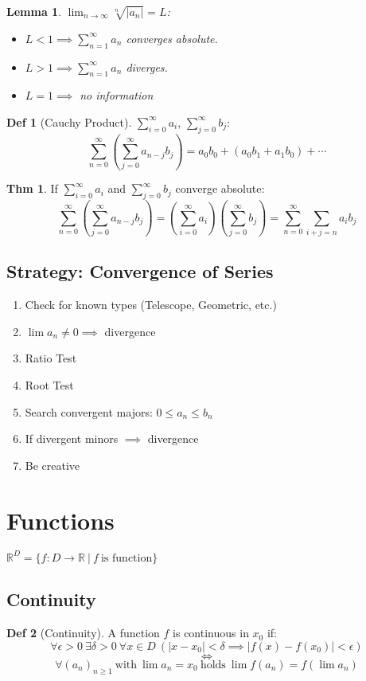 \documentclass[a4paper, 10pt]{article}
\newtheorem*{lemma}{Lemma}
\theoremstyle{definition}
\newtheorem*{theorem}{Thm}
\newtheorem*{definition}{Def}
\theoremstyle{named}
\newcommand{\R}{\mathbb{R}}
\begin{document}
\begin{lemma}
    $\lim_{n\to\infty} \sqrt[n]{|a_n|} = L$:

    \begin{itemize}
        \item $L < 1 \implies \sum_{n=1}^\infty a_n$ converges absolute.
        \item $L > 1 \implies \sum_{n=1}^\infty a_n$ diverges.
        \item $L = 1 \implies$ no information
    \end{itemize}
\end{lemma}

\begin{definition}[Cauchy Product]
    $\sum_{i=0}^\infty a_i$, $\sum_{j=0}^\infty b_j$:
    $$\sum_{n=0}^\infty (\sum_{j=0}^\infty a_{n-j}b_j) = a_0b_0 + (a_0b_1 + a_1b_0) + \cdots$$
\end{definition}

\begin{theorem}
    If $\sum_{i=0}^\infty a_i$ and $\sum_{j=0}^\infty b_j$ converge absolute:
    $$\sum_{n=0}^\infty (\sum_{j=0}^\infty a_{n-j}b_j) = (\sum_{i=0}^\infty a_i) (\sum_{j=0}^\infty b_j) = \sum_{n=0}^\infty \sum_{i+j = n} a_i b_j$$
\end{theorem}

\subsection{Strategy: Convergence of Series}
\begin{enumerate}
    \item Check for known types (Telescope, Geometric, etc.)
    \item $\lim a_n \neq 0 \implies$ divergence
    \item Ratio Test
    \item Root Test
    \item Search convergent majors: $0 \leq a_n \leq b_n$
    \item If divergent minors $\implies$ divergence
    \item Be creative
\end{enumerate}

\section{Functions}
$\R^D = \{f: D \to \R \ | \ f \ \text{is function} \}$
\subsection{Continuity}
\begin{definition}[Continuity]
    A function $f$ is continuous in $x_0$ if:
    $$\forall \epsilon > 0 \ \exists \delta > 0 \ \forall x \in D \ (|x - x_0| < \delta \implies |f(x) - f(x_0)| < \epsilon)$$
    $$\iff$$
    $$\forall (a_n)_{n \geq 1} \ \text{with} \ \lim a_n = x_0 \ \text{holds} \ \lim f(a_n) = f(\lim a_n)$$
\end{definition}
\end{document}
